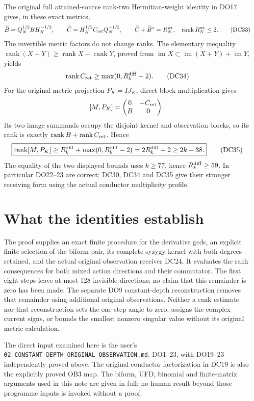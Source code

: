 \documentclass[11pt]{article}
\newcommand{\im}{\operatorname{im}}
\newcommand{\rank}{\operatorname{rank}}
\begin{document}
The original full attained-source rank-two Hermitian-weight identity
in DO17 gives, in these exact metrics,
\[
 \widetilde B=Q_N^{1/2}BH_K^{-1/2},\qquad
 \widetilde C=H_K^{1/2}C_{\rm ret}Q_N^{-1/2},\qquad
 \widetilde C+\widetilde B^*=R_N^{\rm wt},\quad
 \rank R_N^{\rm wt}\le2.                                        \tag{DC33}
\]
The invertible metric factors do not change ranks.  The elementary
inequality $\rank(X+Y)\ge\rank X-\rank Y$, proved from
$\im X\subset\im(X+Y)+\im Y$, yields
\[
 \rank C_{\rm ret}\ge\max(0,R_k^{\rm diff}-2).                  \tag{DC34}
\]
For the original metric projection $P_K=IJ_K$, direct block
multiplication gives
\[
 [M,P_K]=\begin{pmatrix}0&-C_{\rm ret}\\B&0\end{pmatrix}.
\]
Its two image summands occupy the disjoint kernel and observation
blocks, so its rank is exactly $\rank B+\rank C_{\rm ret}$.  Hence
\[
 \boxed{\rank[M,P_K]\ge
 R_k^{\rm diff}+\max(0,R_k^{\rm diff}-2)
 =2R_k^{\rm diff}-2\ge2k-38.}                                   \tag{DC35}
\]
The equality of the two displayed bounds uses $k\ge77$, hence
$R_k^{\rm diff}\ge59$.  In particular DO22--23 are correct; DC30,
DC34 and DC35 give their stronger receiving form using the actual
conductor multiplicity profile.

\section{What the identities establish}
The proof supplies an exact finite procedure for the derivative gcds,
an explicit finite selection of the biform pair, its complete syzygy
kernel with both degrees retained, and the actual original observation
receiver DC24.  It evaluates the rank consequences for both mixed
action directions and their commutator.  The first eight steps leave
at most 128 invisible directions; no claim that this remainder is
zero has been made.  The separate DO9 constant-depth reconstruction
removes that remainder using additional original observations.
Neither a rank estimate nor that reconstruction sets the one-step
angle to zero, assigns the complex current signs, or bounds the
smallest nonzero singular value without its original metric calculation.

The direct input examined here is the user's
\texttt{02\_CONSTANT\_DEPTH\_ORIGINAL\_OBSERVATION.md}, DO1--23,
with DO19--23 independently proved above.  The original conductor
factorization in DC19 is also the explicitly proved OB3 map.
The biform, UFD, binomial and finite-matrix arguments used in this
note are given in full; no human result beyond those programme
inputs is invoked without a proof.
\end{document}
